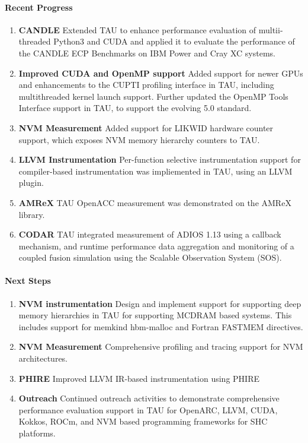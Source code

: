 \paragraph{Recent Progress}
\begin{enumerate}
\item \textbf{CANDLE} Extended TAU to enhance performance evaluation of multii-threaded Python3 and CUDA and applied it to evaluate the performance of the CANDLE ECP Benchmarks on IBM Power and Cray XC systems. 

\item \textbf{Improved CUDA and OpenMP support} Added support for newer GPUs and enhancements to the CUPTI profiling interface in TAU, including multithreaded kernel launch support.  Further updated the OpenMP Tools Interface support in TAU, to support the evolving 5.0 standard. 

\item \textbf{NVM Measurement} Added support for LIKWID hardware counter support, which exposes NVM memory hierarchy counters to TAU.

\item \textbf{LLVM Instrumentation} Per-function selective instrumentation support for compiler-based instrumentation was impliemented in TAU, using an LLVM plugin.

\item \textbf{AMReX} TAU OpenACC measurement was demonstrated on the AMReX library.

\item \textbf{CODAR} TAU integrated measurement of ADIOS 1.13 using a callback mechanism, and runtime performance data aggregation and monitoring of a coupled fusion simulation using the Scalable Observation System (SOS).
\end{enumerate}

\paragraph{Next Steps}
\begin{enumerate}
\item \textbf{NVM instrumentation} 
Design and implement support for supporting deep memory hierarchies in TAU for supporting MCDRAM based systems. This includes support for memkind hbm-malloc and Fortran FASTMEM directives. 

\item \textbf{NVM Measurement} 
Comprehensive profiling and tracing support for NVM architectures.

\item \textbf{PHIRE} 
Improved LLVM IR-based instrumentation using PHIRE

\item \textbf{Outreach}
Continued outreach activities to demonstrate comprehensive performance evaluation support in TAU for OpenARC, LLVM, CUDA, Kokkos, ROCm, and NVM based programming frameworks for SHC platforms. 
\end{enumerate}